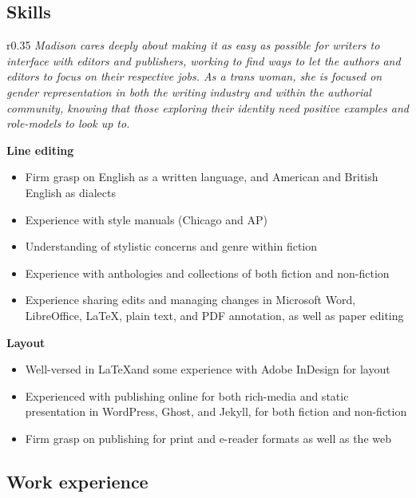 \subsection{Skills}

\begin{wrapfigure}{r}{0.35\linewidth}
  \textit{\color{titlegreydark} \large Madison cares deeply about making it as easy as possible for writers to interface with editors and publishers, working to find ways to let the authors and editors to focus on their respective jobs. As a trans woman, she is focused on gender representation in both the writing industry and within the authorial community, knowing that those exploring their identity need positive examples and role-models to look up to.}
  \vspace{-1in}
\end{wrapfigure}

\textbf{Line editing}

\begin{itemize}
  \item Firm grasp on English as a written language, and American and British English as dialects
  \item Experience with style manuals (Chicago and AP)
  \item Understanding of stylistic concerns and genre within fiction
  \item Experience with anthologies and collections of both fiction and non-fiction
  \item Experience sharing edits and managing changes in Microsoft Word, LibreOffice, \LaTeX, plain text, and PDF annotation, as well as paper editing
\end{itemize}

\hspace{-1.5em}\textbf{Layout}

\begin{itemize}
  \item Well-versed in \LaTeX and some experience with Adobe InDesign for layout
  \item Experienced with publishing online for both rich-media and static presentation in WordPress, Ghost, and Jekyll, for both fiction and non-fiction
  \item Firm grasp on publishing for print and e-reader formats as well as the web
\end{itemize}

\newpage

\subsection{Work experience}

